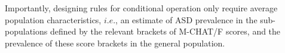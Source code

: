 \documentclass[onecolumn, compsoc,11pt]{IEEEtran}
\makeatletter
\renewcommand\subsection{\@startsection {subsection}{2}{\z@}%
                                   {0ex \@plus -1.75ex \@minus -1.2ex}%
                                   {0ex \@plus.0ex}%
                                   {\fontsize{11}{11}\selectfont\bfseries\sffamily\color{black}}}
\def\ZERO{ACoR\xspace}
\makeatother
\begin{document}
%
%
Importantly, designing  rules for  conditional  operation  only require average population characteristics, $i.e.$, an  estimate of ASD prevalence in the sub-populations defined by the  relevant brackets of M-CHAT/F scores, and the prevalence of these score brackets in the general population.
%



  
\end{document}
